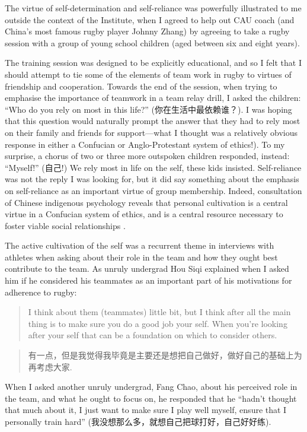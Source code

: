 \begin{CJK}{UTF8}{gbsn}
The virtue of self-determination and self-reliance was powerfully illustrated to me outside the context of the Institute, when I agreed to help out CAU coach (and China's most famous rugby player Johnny Zhang) by agreeing to take a rugby session with a group of young school children (aged between six and eight years).

The training session was designed to be explicitly educational, and so I felt that I should attempt to tie some of the elements of team work in rugby to virtues of friendship and cooperation.  Towards the end of the session, when trying to emphasise the importance of teamwork in a team relay drill, I asked the children: ``Who do you rely on most in this life?'' (你在生活中最依赖谁？).  I was hoping that this question would naturally prompt the answer that they had to rely most on their family and friends for support---what I thought was a relatively obvious response in either a Confucian or Anglo-Protestant system of ethics!).  To my surprise, a chorus of two or three more outspoken children responded, instead: ``Myself!'' (自己!) We rely most in life on the self, these kids insisted. Self-reliance was not the reply I was looking for, but it did say something about the emphasis on self-reliance as an important virtue of group membership.  Indeed, consultation of Chinese indigenous psychology reveals that personal cultivation is a central virtue in a Confucian system of ethics, and is a central resource necessary to foster viable social relationships \citep{Liu2014}.

The active cultivation of the self was a recurrent theme in interviews with athletes when asking about their role in the team and how they ought best contribute to the team.  As unruly undergrad Hou Siqi explained when I asked him if he considered his teammates as an important part of his motivations for adherence to rugby:
       \begin{quote}
           I think about them (teammates) little bit, but I think after all the main thing is to make sure you do a good job your self.  When you're looking after your self that can be a foundation on which to consider others.
       \end{quote}
       \begin{quote}
             有一点，但是我觉得我毕竟是主要还是想把自己做好，做好自己的基础上为再考虑大家.
       \end{quote}

When I asked another unruly undergrad, Fang Chao, about his perceived role in the team, and what he ought to focus on, he responded that he ``hadn't thought that much about it, I just want to make sure I play well myself, ensure that I personally train hard'' (我没想那么多，就想自己把球打好，自己好好练).



\end{CJK}
